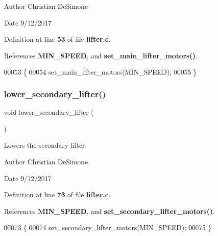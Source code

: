\begin{DoxyAuthor}{Author}
Christian De\+Simone 
\end{DoxyAuthor}
\begin{DoxyDate}{Date}
9/12/2017 
\end{DoxyDate}


Definition at line \textbf{ 53} of file \textbf{ lifter.\+c}.



References \textbf{ M\+I\+N\+\_\+\+S\+P\+E\+ED}, and \textbf{ set\+\_\+main\+\_\+lifter\+\_\+motors()}.


\begin{DoxyCode}
00053                         \{
00054   set_main_lifter_motors(MIN_SPEED);
00055 \}
\end{DoxyCode}
\mbox{\label{lifter_8h_af76abbd394bf206ab56fa237d776f2b3}} 
\subsubsection{lower\+\_\+secondary\+\_\+lifter()}
{\footnotesize\ttfamily void lower\+\_\+secondary\+\_\+lifter (\begin{DoxyParamCaption}{ }\end{DoxyParamCaption})}



Lowers the secondary lifter. 

\begin{DoxyAuthor}{Author}
Christian De\+Simone 
\end{DoxyAuthor}
\begin{DoxyDate}{Date}
9/12/2017 
\end{DoxyDate}


Definition at line \textbf{ 73} of file \textbf{ lifter.\+c}.



References \textbf{ M\+I\+N\+\_\+\+S\+P\+E\+ED}, and \textbf{ set\+\_\+secondary\+\_\+lifter\+\_\+motors()}.


\begin{DoxyCode}
00073                              \{
00074   set_secondary_lifter_motors(MIN_SPEED);
00075 \}
\end{DoxyCode}
\mbox{\label{lifter_8h_a2e2bd38b5b8b52378f3510368bf8aa0a}} 
